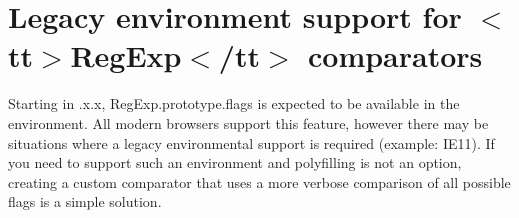 \chapter{Legacy environment support for \texorpdfstring{$<$}{<}tt\texorpdfstring{$>$}{>}Reg\+Exp\texorpdfstring{$<$}{<}/tt\texorpdfstring{$>$}{>} comparators}
\hypertarget{md_node__modules_2fast-equals_2recipes_2legacy-regexp-support}{}\label{md_node__modules_2fast-equals_2recipes_2legacy-regexp-support}
\label{md_node__modules_2fast-equals_2recipes_2legacy-regexp-support_autotoc_md15081}%
%


Starting in {.\+x.\+x}, {\ttfamily Reg\+Exp.\+prototype.\+flags} is expected to be available in the environment. All modern browsers support this feature, however there may be situations where a legacy environmental support is required (example\+: IE11). If you need to support such an environment and polyfilling is not an option, creating a custom comparator that uses a more verbose comparison of all possible flags is a simple solution.


\begin{DoxyCode}{0}
\DoxyCodeLine{}
\DoxyCodeLine{}
\DoxyCodeLine{\});}
\DoxyCodeLine{\});}

\end{DoxyCode}
 